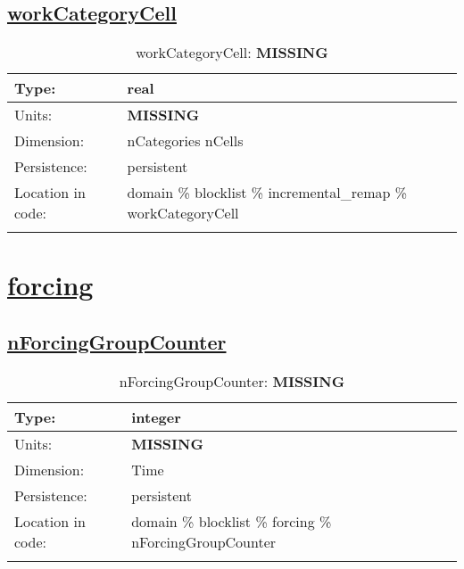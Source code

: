 \subsection[workCategoryCell]{\hyperref[sec:var_tab_incremental_remap]{workCategoryCell}}
\label{subsec:var_sec_incremental_remap_workCategoryCell}
\begin{center}
\begin{longtable}{| p{2.0in} | p{4.0in} |}
        \hline 
        Type: & real \\
        \hline 
        Units: & {\bf \color{red} MISSING} \\
        \hline 
        Dimension: & nCategories nCells \\
        \hline 
        Persistence: & persistent \\
        \hline 
         Location in code: & domain \% blocklist \% incremental\_remap \% workCategoryCell \\
         \hline 
    \caption{workCategoryCell: {\bf \color{red} MISSING}}
\end{longtable}
\end{center}
\section[forcing]{\hyperref[sec:var_tab_forcing]{forcing}}
\label{sec:var_sec_forcing}
\subsection[nForcingGroupCounter]{\hyperref[sec:var_tab_forcing]{nForcingGroupCounter}}
\label{subsec:var_sec_forcing_nForcingGroupCounter}
\begin{center}
\begin{longtable}{| p{2.0in} | p{4.0in} |}
        \hline 
        Type: & integer \\
        \hline 
        Units: & {\bf \color{red} MISSING} \\
        \hline 
        Dimension: & Time \\
        \hline 
        Persistence: & persistent \\
        \hline 
         Location in code: & domain \% blocklist \% forcing \% nForcingGroupCounter \\
         \hline 
    \caption{nForcingGroupCounter: {\bf \color{red} MISSING}}
\end{longtable}
\end{center}
